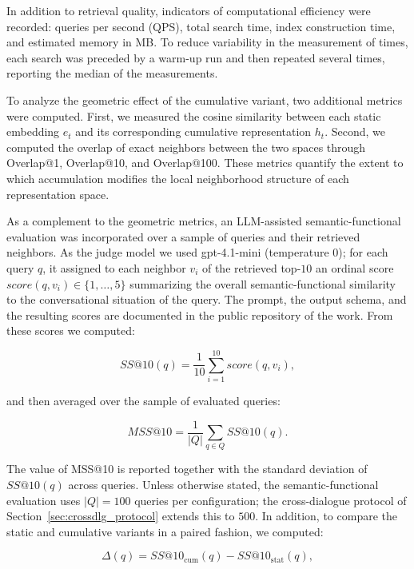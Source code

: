 \documentclass[runningheads]{llncs}
\begin{document}
In addition to retrieval quality, indicators of computational efficiency were recorded: queries per second (QPS), total search time, index construction time, and estimated memory in MB. To reduce variability in the measurement of times, each search was preceded by a warm-up run and then repeated several times, reporting the median of the measurements.

To analyze the geometric effect of the cumulative variant, two additional metrics were computed. First, we measured the cosine similarity between each static embedding $e_t$ and its corresponding cumulative representation $h_t$. Second, we computed the overlap of exact neighbors between the two spaces through Overlap@1, Overlap@10, and Overlap@100. These metrics quantify the extent to which accumulation modifies the local neighborhood structure of each representation space.

As a complement to the geometric metrics, an LLM-assisted semantic-functional evaluation was incorporated over a sample of queries and their retrieved neighbors. As the judge model we used gpt-4.1-mini (temperature $0$); for each query $q$, it assigned to each neighbor $v_i$ of the retrieved top-$10$ an ordinal score $score(q,v_i) \in \{1,\ldots,5\}$ summarizing the overall semantic-functional similarity to the conversational situation of the query. The prompt, the output schema, and the resulting scores are documented in the public repository of the work. From these scores we computed:

\begin{equation}
    SS@10(q)=\frac{1}{10}\sum_{i=1}^{10} score(q,v_i),
\end{equation}

\noindent and then averaged over the sample of evaluated queries:

\begin{equation}
    MSS@10=\frac{1}{|Q|}\sum_{q \in Q} SS@10(q).
\end{equation}

The value of MSS@10 is reported together with the standard deviation of $SS@10(q)$ across queries. Unless otherwise stated, the semantic-functional evaluation uses $|Q|=100$ queries per configuration; the cross-dialogue protocol of Section~\ref{sec:crossdlg_protocol} extends this to $500$. In addition, to compare the static and cumulative variants in a paired fashion, we computed:

\begin{equation}
    \Delta(q)=SS@10_{\mathrm{cum}}(q)-SS@10_{\mathrm{stat}}(q),
\end{equation}
\end{document}
